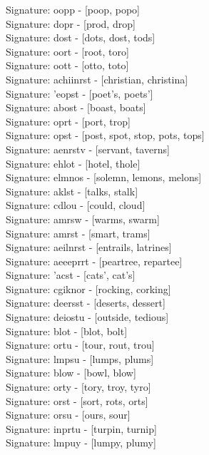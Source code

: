 Signature: {oopp} - [poop, popo] \\
Signature: {dopr} - [prod, drop] \\
Signature: {dost} - [dots, dost, tods] \\
Signature: {oort} - [root, toro] \\
Signature: {oott} - [otto, toto] \\
Signature: {achiinrst} - [christian, christina] \\
Signature: {'eopst} - [poet's, poets'] \\
Signature: {abost} - [boast, boats] \\
Signature: {oprt} - [port, trop] \\
Signature: {opst} - [post, spot, stop, pots, tops] \\
Signature: {aenrstv} - [servant, taverns] \\
Signature: {ehlot} - [hotel, thole] \\
Signature: {elmnos} - [solemn, lemons, melons] \\
Signature: {aklst} - [talks, stalk] \\
Signature: {cdlou} - [could, cloud] \\
Signature: {amrsw} - [warms, swarm] \\
Signature: {amrst} - [smart, trams] \\
Signature: {aeilnrst} - [entrails, latrines] \\
Signature: {aeeeprrt} - [peartree, repartee] \\
Signature: {'acst} - [cats', cat's] \\
Signature: {cgiknor} - [rocking, corking] \\
Signature: {deersst} - [deserts, dessert] \\
Signature: {deiostu} - [outside, tedious] \\
Signature: {blot} - [blot, bolt] \\
Signature: {ortu} - [tour, rout, trou] \\
Signature: {lmpsu} - [lumps, plums] \\
Signature: {blow} - [bowl, blow] \\
Signature: {orty} - [tory, troy, tyro] \\
Signature: {orst} - [sort, rots, orts] \\
Signature: {orsu} - [ours, sour] \\
Signature: {inprtu} - [turpin, turnip] \\
Signature: {lmpuy} - [lumpy, plumy] \\
